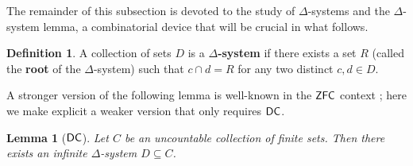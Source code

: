 \documentclass[10pt,a4paper]{amsart}
\newtheorem{lemma}[theorem]{Lemma}
\theoremstyle{definition}
\newtheorem{definition}[theorem]{Definition}
\newcommand{\dc}{\mathnormal{\mathsf{DC}}}
\newcommand{\zfc}{\mathnormal{\mathsf{ZFC}}}
\theoremstyle{remark}
\newtheorem{remark}[theorem]{Remark}
\numberwithin{equation}{section}
\begin{document}




The remainder of this subsection is devoted to the study of $\Delta$-systems and the $\Delta$-system lemma, a combinatorial device that will be crucial in what follows.
    
\begin{definition}\label{def:delta-system}
A collection of sets $D$ is a {\bf $\Delta$-system} if there exists a set $R$ (called the {\bf root} of the $\Delta$-system) such that $c\cap d=R$ for any two distinct $c,d\in D$.
\end{definition}

A stronger version of the following lemma is well-known in the $\zfc$ context \cite{ErdosRado1960}; here we make explicit a weaker version that only requires $\dc$.


\begin{lemma}[$\dc$]\label{lem:delta-system-dc}
Let $C$ be an uncountable collection of finite sets. Then there exists an infinite $\Delta$-system $D\subseteq C$.
\end{lemma}
\end{document}
